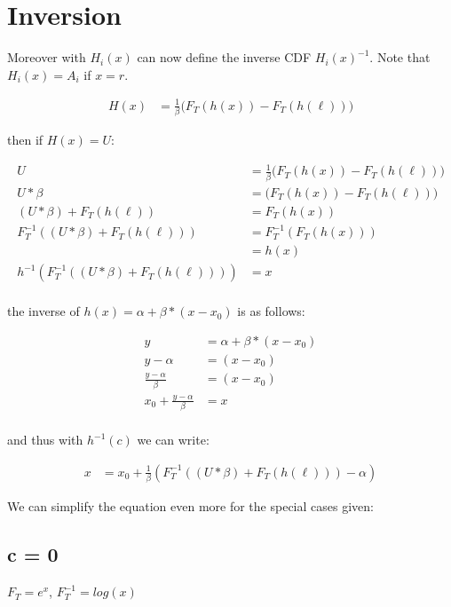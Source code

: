 \section{Inversion}

Moreover with $H_i(x)$ can now define the inverse CDF $H_i(x)^{-1}$. Note that
$H_i(x) = A_i$ if $x = r$.

\begin{align*}
H(x) &= \frac{1}{\beta} \big( F_T (h(x)) - F_T(h(\ell)) \big)
\end{align*}

then if $H(x) = U$:

\begin{align*}
U &= \frac{1}{\beta} \big( F_T (h(x)) - F_T(h(\ell)) \big) \\
U * \beta &=\big( F_T (h(x)) - F_T(h(\ell)) \big) \\
(U * \beta) + F_T(h(\ell)) &= F_T (h(x)) \\
F_T^{-1} ( (U * \beta) + F_T(h(\ell))) &= F_T^{-1}( F_T (h(x))) \\
 &= h(x) \\
h^{-1} \left( F_T^{-1} ( (U * \beta) + F_T(h(\ell))) \right) &= x \\
\end{align*}

the inverse of $h(x) = \alpha + \beta * (x - x_0)$ is as follows:

\begin{align*}
y &= \alpha + \beta * (x - x_0) \\
y - \alpha &= (x - x_0) \\
\frac{y - \alpha}{\beta} &=  (x - x_0) \\
x_0 + \frac{y - \alpha}{\beta} &=  x \\
\end{align*}

and thus with $h^{-1}(c)$ we can write:

\begin{align*}
	x &= x_0 + \frac{1}{\beta} \left( F_T^{-1} ( (U * \beta) + F_T(h(\ell))) - \alpha \right)
\end{align*}

We can simplify the equation even more for the special cases given:

\subsection{c = 0}

$F_T = e^x$, $F_T^{-1} = log(x)$

